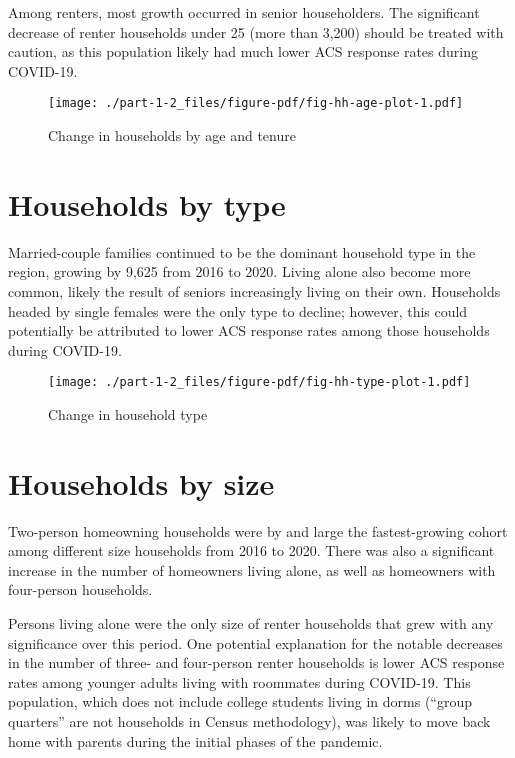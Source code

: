 \documentclass[
  letterpaper,
  DIV=11,
  numbers=noendperiod]{scrreprt}
\begin{document}
Among renters, most growth occurred in senior householders. The
significant decrease of renter households under 25 (more than 3,200)
should be treated with caution, as this population likely had much lower
ACS response rates during COVID-19.

\begin{figure}

{\centering \texttt{[image: ./part-1-2\_files/figure-pdf/fig-hh-age-plot-1.pdf]}

}

\caption{\label{fig-hh-age-plot}Change in households by age and tenure}

\end{figure}

\hypertarget{households-by-type}{%
\section{Households by type}\label{households-by-type}}

Married-couple families continued to be the dominant household type in
the region, growing by 9,625 from 2016 to 2020. Living alone also become
more common, likely the result of seniors increasingly living on their
own. Households headed by single females were the only type to decline;
however, this could potentially be attributed to lower ACS response
rates among those households during COVID-19.

\begin{figure}

{\centering \texttt{[image: ./part-1-2\_files/figure-pdf/fig-hh-type-plot-1.pdf]}

}

\caption{\label{fig-hh-type-plot}Change in household type}

\end{figure}

\hypertarget{households-by-size}{%
\section{Households by size}\label{households-by-size}}

Two-person homeowning households were by and large the fastest-growing
cohort among different size households from 2016 to 2020. There was also
a significant increase in the number of homeowners living alone, as well
as homeowners with four-person households.

Persons living alone were the only size of renter households that grew
with any significance over this period. One potential explanation for
the notable decreases in the number of three- and four-person renter
households is lower ACS response rates among younger adults living with
roommates during COVID-19. This population, which does not include
college students living in dorms (``group quarters'' are not households
in Census methodology), was likely to move back home with parents during
the initial phases of the pandemic.
\end{document}
